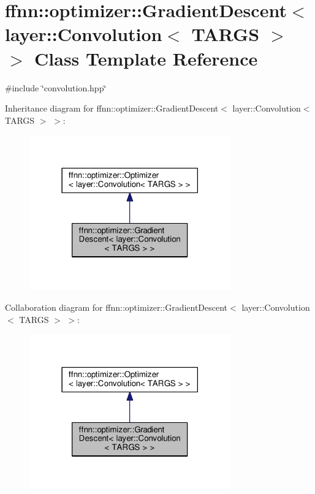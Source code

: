 \hypertarget{classffnn_1_1optimizer_1_1_gradient_descent_3_01layer_1_1_convolution_3_01_t_a_r_g_s_01_4_01_4}{\section{ffnn\-:\-:optimizer\-:\-:Gradient\-Descent$<$ layer\-:\-:Convolution$<$ T\-A\-R\-G\-S $>$ $>$ Class Template Reference}
\label{classffnn_1_1optimizer_1_1_gradient_descent_3_01layer_1_1_convolution_3_01_t_a_r_g_s_01_4_01_4}
}


{\ttfamily \#include \char`\"{}convolution.\-hpp\char`\"{}}



Inheritance diagram for ffnn\-:\-:optimizer\-:\-:Gradient\-Descent$<$ layer\-:\-:Convolution$<$ T\-A\-R\-G\-S $>$ $>$\-:\nopagebreak
\begin{figure}[H]
\begin{center}
\leavevmode
\includegraphics[width=246pt]{classffnn_1_1optimizer_1_1_gradient_descent_3_01layer_1_1_convolution_3_01_t_a_r_g_s_01_4_01_4__inherit__graph}
\end{center}
\end{figure}


Collaboration diagram for ffnn\-:\-:optimizer\-:\-:Gradient\-Descent$<$ layer\-:\-:Convolution$<$ T\-A\-R\-G\-S $>$ $>$\-:\nopagebreak
\begin{figure}[H]
\begin{center}
\leavevmode
\includegraphics[width=246pt]{classffnn_1_1optimizer_1_1_gradient_descent_3_01layer_1_1_convolution_3_01_t_a_r_g_s_01_4_01_4__coll__graph}
\end{center}
\end{figure}
